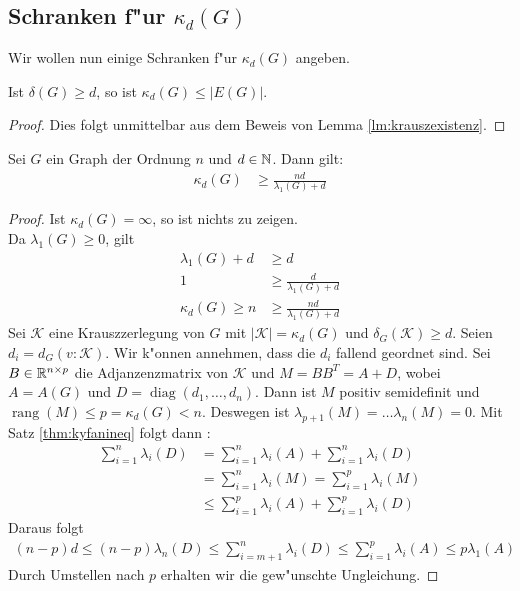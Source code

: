 \subsection{Schranken f"ur $\kappa_d(G)$}

Wir wollen nun einige Schranken f"ur $\kappa_{d}(G)$ angeben. 
\begin{lemma}
  Ist $\delta(G) \geq d$, so ist $\kappa_{d}(G) \leq |E(G)|$. 
\end{lemma}
\begin{proof}
  Dies folgt unmittelbar aus dem Beweis von Lemma \ref{lm:krauszexistenz}. 
\end{proof}

\begin{theorem}
  Sei $G$ ein Graph der Ordnung $n$ und $d\in {\mathbb{N}}$. Dann gilt:
  \begin{align*}
    \kappa_{d}(G) &\geq \frac{nd}{\lambda_{1}(G) +d} 
  \end{align*}
  \label{thm:kappaineq1}
\end{theorem}

\begin{proof}
  Ist $\kappa_{d}(G) = \infty$, so ist nichts zu zeigen. \\
   Da $\lambda_{1}(G) \geq 0$, gilt 
  \begin{align*}
    \lambda_{1}(G) + d &\geq d \\
    1 &\geq \frac{d}{\lambda_{1}(G) + d }\\
    \kappa_{d}(G) \geq n &\geq \frac{nd}{\lambda_{1}(G)+d}
  \end{align*}
  Sei $\mathcal{K}$ eine Krauszzerlegung von $G$ mit $|\mathcal{K}| = \kappa_{d}(G)$ und $\delta_{G}(\mathcal{K}) \geq d$. Seien $d_{i} = d_{G}(v:\mathcal{K})$. Wir k"onnen annehmen, dass die $d_{i}$ fallend geordnet sind. Sei $B\in {\mathbb{R}}^{n\times p}$ die Adjanzenzmatrix von $\mathcal{K}$ und $M = BB^{T} = A+D$, wobei $A= A(G)$ und $D = \operatorname{diag}(d_{1},\dots,d_n)$.
  Dann ist $M$ positiv semidefinit und $\operatorname{rang} (M) \leq p = \kappa_{d}(G) < n $. Deswegen ist $\lambda_{p+1}(M) = \dots \lambda_{n}(M) = 0$. 
  Mit Satz \ref{thm:kyfanineq} folgt dann : 
  \begin{align*}
    \sum\limits_{i=1}^{n} \lambda_{i}(D) &=\sum\limits_{i=1}^{n} \lambda_{i}(A) +\sum\limits_{i=1}^{n}  \lambda_{i}(D) \\
    &=\sum\limits_{i=1}^{n} \lambda_{i}(M) =\sum\limits_{i=1}^{p} \lambda_{i}(M) \\
    &\leq \sum\limits_{i=1}^{p} \lambda_{i}(A) +\sum\limits_{i=1}^{p} \lambda_{i}(D)
  \end{align*}
  Daraus folgt 
  \begin{align*}
    (n-p) d \leq (n-p) \lambda_n(D) \leq \sum\limits_{i=m+1}^{n} \lambda_{i}(D) \leq\sum\limits_{i=1}^{p} \lambda_{i}(A) \leq p\lambda_{1}(A)
  \end{align*}
  Durch Umstellen nach $p$ erhalten wir die gew"unschte Ungleichung.
\end{proof}


